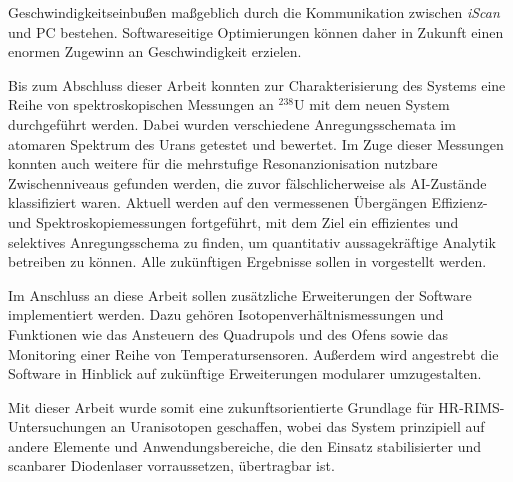 Geschwindigkeitseinbußen maßgeblich durch die Kommunikation zwischen
\textit{iScan} und PC bestehen. Softwareseitige Optimierungen können daher
in Zukunft einen enormen Zugewinn an Geschwindigkeit erzielen.\par
Bis zum Abschluss dieser Arbeit konnten zur Charakterisierung des Systems eine
Reihe von spektroskopischen Messungen an $^{238}$U mit dem neuen System
durchgeführt werden. Dabei wurden verschiedene Anregungsschemata im atomaren
Spektrum des Urans getestet und bewertet. Im Zuge dieser Messungen konnten auch
weitere für die mehrstufige Resonanzionisation nutzbare Zwischenniveaus
gefunden werden, die zuvor fälschlicherweise als AI-Zustände klassifiziert
waren. Aktuell werden auf den vermessenen Übergängen Effizienz- und
Spektroskopiemessungen fortgeführt, mit dem Ziel ein effizientes und selektives Anregungsschema zu finden, um quantitativ aussagekräftige Analytik betreiben zu können. Alle zukünftigen Ergebnisse sollen in
\cite{hakimi:2012:dissertation} vorgestellt werden.\par
Im Anschluss an diese Arbeit sollen zusätzliche Erweiterungen der Software
implementiert werden. Dazu gehören Isotopenverhältnismessungen und Funktionen
wie das Ansteuern des Quadrupols und des Ofens sowie das Monitoring einer Reihe
von Temperatursensoren. Außerdem wird angestrebt die Software in Hinblick auf
zukünftige Erweiterungen modularer umzugestalten.\par
Mit dieser Arbeit wurde somit eine zukunftsorientierte Grundlage für
HR-RIMS-Untersuchungen an Uranisotopen geschaffen, wobei das System prinzipiell
auf andere Elemente und Anwendungsbereiche, die den Einsatz stabilisierter und
scanbarer Diodenlaser vorraussetzen, übertragbar ist.